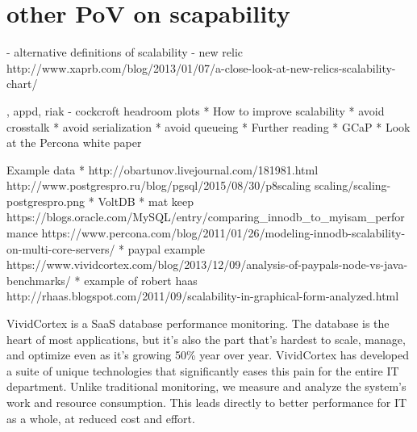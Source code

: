 \documentclass{vivid_layout_pdf}
\begin{document}
\section{other PoV on scapability}
	- alternative definitions of scalability - new relic
	 http://www.xaprb.com/blog/2013/01/07/a-close-look-at-new-relics-scalability-chart/

	, appd, riak
	- cockcroft headroom plots
* How to improve scalability
    * avoid crosstalk
	     * avoid serialization
		      * avoid queueing
* Further reading
				    * GCaP
					     * Look at the Percona white paper


Example data
* http://obartunov.livejournal.com/181981.html
  http://www.postgrespro.ru/blog/pgsql/2015/08/30/p8scaling
  scaling/scaling-postgrespro.png
* VoltDB
* mat keep
https://blogs.oracle.com/MySQL/entry/comparing\_innodb\_to\_myisam\_performance
https://www.percona.com/blog/2011/01/26/modeling-innodb-scalability-on-multi-core-servers/
* paypal example
https://www.vividcortex.com/blog/2013/12/09/analysis-of-paypals-node-vs-java-benchmarks/
* example of robert haas
http://rhaas.blogspot.com/2011/09/scalability-in-graphical-form-analyzed.html


\newpage

\begin{about}	%
VividCortex is a SaaS database performance monitoring. The database is the heart of most applications, but it's also the part that's hardest to scale, manage, and optimize even as it's growing 50\% year over year. VividCortex has developed a suite of unique technologies that significantly eases this pain for the entire IT department. Unlike traditional monitoring, we measure
and analyze the system's work and resource consumption. This leads directly to better performance for IT as a whole, at reduced cost and effort.
\end{about}
\makeresources	%
\end{document}
